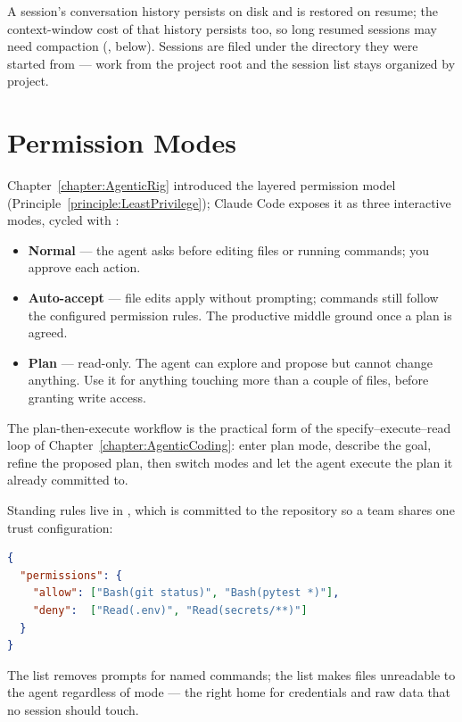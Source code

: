 A session's conversation history persists on disk and is restored on resume; the context-window cost of that history persists too, so long resumed sessions may need compaction (, below).
Sessions are filed under the directory they were started from --- work from the project root and the session list stays organized by project.

\section{Permission Modes}

Chapter~\ref{chapter:AgenticRig} introduced the layered permission model (Principle~\ref{principle:LeastPrivilege}); Claude Code exposes it as three interactive modes, cycled with :

\begin{itemize}
\item \textbf{Normal} --- the agent asks before editing files or running commands; you approve each action.
\item \textbf{Auto-accept} --- file edits apply without prompting; commands still follow the configured permission rules. The productive middle ground once a plan is agreed.
\item \textbf{Plan} --- read-only. The agent can explore and propose but cannot change anything. Use it for anything touching more than a couple of files, before granting write access.
\end{itemize}

The plan-then-execute workflow is the practical form of the specify--execute--read loop of Chapter~\ref{chapter:AgenticCoding}: enter plan mode, describe the goal, refine the proposed plan, then switch modes and let the agent execute the plan it already committed to.

Standing rules live in , which is committed to the repository so a team shares one trust configuration:

\begin{lstlisting}[language=json]
{
  "permissions": {
    "allow": ["Bash(git status)", "Bash(pytest *)"],
    "deny":  ["Read(.env)", "Read(secrets/**)"]
  }
}
\end{lstlisting}

The  list removes prompts for named commands; the  list makes files unreadable to the agent regardless of mode --- the right home for credentials and raw data that no session should touch.

